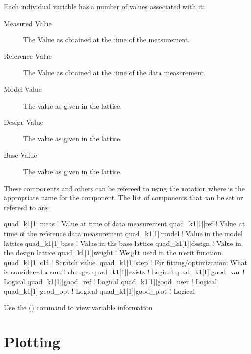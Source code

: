 Each individual variable has a number of values associated with it:
  \vspace*{-3ex}
  \begin{description}
  \item[Measured Value] \Newline
The Value as obtained at the time of the  measurement.
  \item[Reference Value] \Newline
The Value as obtained at the time of the  data  measurement.
  \item[Model Value] \Newline
The value as given in the  lattice.
  \item[Design Value] \Newline
The value as given in the  lattice.
  \item[Base Value] \Newline
The value as given in the  lattice.
  \end{description}
These components and others can be refereed to using the notation
 where  is the appropriate name for the
component. The list of components that can be set or refereed to are:
\begin{example}
  quad_k1[1]|meas      ! Value at time of data measurement
  quad_k1[1]|ref       ! Value at time of the reference data measurement
  quad_k1[1]|model     ! Value in the model lattice
  quad_k1[1]|base      ! Value in the base lattice
  quad_k1[1]|design    ! Value in  the design lattice
  quad_k1[1]|weight    ! Weight used in the merit function.
  quad_k1[1]|old       ! Scratch value.
  quad_k1[1]|step      ! For fitting/optimization: What is considered a small change.
  quad_k1[1]|exists    ! Logical
  quad_k1[1]|good_var  ! Logical
  quad_k1[1]|good_ref  ! Logical
  quad_k1[1]|good_user ! Logical
  quad_k1[1]|good_opt  ! Logical
  quad_k1[1]|good_plot ! Logical
\end{example}

Use the  () command to view variable information

\section{Plotting}
\label{s:arithmetic}


